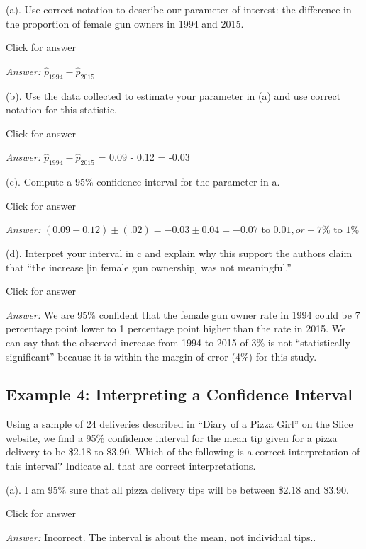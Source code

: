 \documentclass[
]{book}
\begin{document}
(a). Use correct notation to describe our parameter of interest: the difference in the proportion of female gun owners in 1994 and 2015.

Click for answer

\emph{Answer:} \(\hat{p}_{1994} - \hat{p}_{2015}\)

(b). Use the data collected to estimate your parameter in (a) and use correct notation for this statistic.

Click for answer

\emph{Answer:} \(\hat{p}_{1994} - \hat{p}_{2015}\) = 0.09 - 0.12 = -0.03

(c). Compute a 95\% confidence interval for the parameter in a.

Click for answer

\emph{Answer:} \((0.09 - 0.12) \pm (.02) = -0.03 \pm 0.04 = -0.07 \text{ to } 0.01, or -7\% \text{ to } 1\%\)

(d). Interpret your interval in c and explain why this support the authors claim that ``the increase {[}in female gun ownership{]} was not meaningful.''

Click for answer

\emph{Answer:} We are 95\% confident that the female gun owner rate in 1994 could be 7 percentage point lower to 1 percentage point higher than the rate in 2015. We can say that the observed increase from 1994 to 2015 of 3\% is not ``statistically significant'' because it is within the margin of error (4\%) for this study.

\hypertarget{example-4-interpreting-a-confidence-interval}{%
\subsection{Example 4: Interpreting a Confidence Interval}\label{example-4-interpreting-a-confidence-interval}}

Using a sample of 24 deliveries described in ``Diary of a Pizza Girl'' on the Slice website, we find a 95\% confidence interval for the mean tip given for a pizza delivery to be \$2.18 to \$3.90. Which of the following is a correct interpretation of this interval? Indicate all that are correct interpretations.

(a). I am 95\% sure that all pizza delivery tips will be between \$2.18 and \$3.90.

Click for answer

\emph{Answer:} Incorrect. The interval is about the mean, not individual tips..
\end{document}
